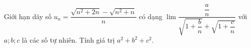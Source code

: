 \begin{ex}
Giới hạn dãy số $u_n=\dfrac{\sqrt{n^2+2n}-\sqrt{n^2+n}}n$ có dạng $\lim\dfrac{\dfrac an}{\sqrt{1+\dfrac bn}+\sqrt{1+\dfrac cn}}$ với $a;b;c$ là các số tự nhiên. Tính giá trị $a^2+b^2+c^2$.
\end{ex}
